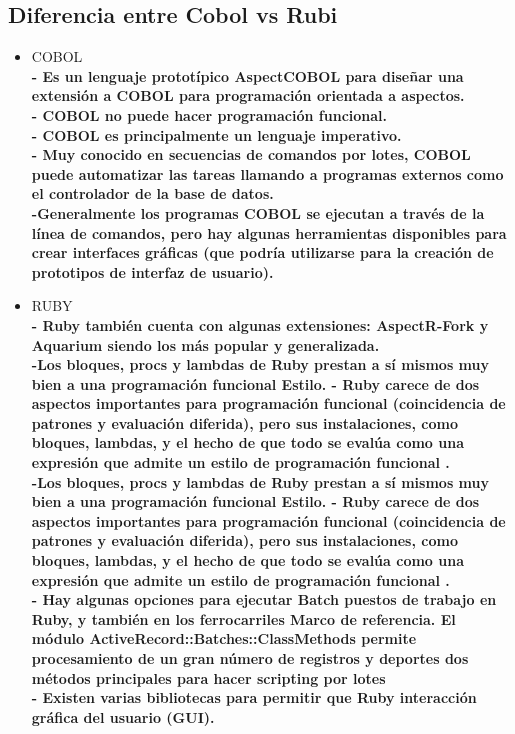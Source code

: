\documentclass[twoside,twocolumn]{article}
\begin{document}
\subsection{Diferencia entre Cobol vs Rubi}
\begin{itemize}
\item COBOL
\\ \textbf{- Es un lenguaje prototípico AspectCOBOL para diseñar una extensión a COBOL para programación orientada a aspectos.}
\\ \textbf{- COBOL no puede hacer programación funcional.}
\\ \textbf{- COBOL es principalmente un lenguaje imperativo. }
\\ \textbf{- Muy conocido en secuencias de comandos por lotes, COBOL puede automatizar las tareas llamando a programas externos
como el controlador de la base de datos.}
\\ \textbf{-Generalmente los programas COBOL se ejecutan a través de
la línea de comandos, pero hay algunas herramientas
disponibles para crear interfaces gráficas (que
podría utilizarse para la creación de prototipos de interfaz de usuario).}
\item RUBY
\\ \textbf{- Ruby también cuenta con algunas extensiones:
AspectR-Fork y Aquarium siendo los más
popular y generalizada.}
\\ \textbf{-Los bloques, procs y lambdas de Ruby prestan
a sí mismos muy bien a una programación funcional
Estilo.
- Ruby carece de dos aspectos importantes para
programación funcional (coincidencia de patrones y
evaluación diferida), pero sus instalaciones, como
bloques, lambdas, y el hecho de que todo
se evalúa como una expresión que admite un
estilo de programación funcional
.}
\\ \textbf{-Los bloques, procs y lambdas de Ruby prestan
a sí mismos muy bien a una programación funcional
Estilo.
- Ruby carece de dos aspectos importantes para
programación funcional (coincidencia de patrones y
evaluación diferida), pero sus instalaciones, como
bloques, lambdas, y el hecho de que todo
se evalúa como una expresión que admite un
estilo de programación funcional
.}
\\ \textbf{-  Hay algunas opciones para ejecutar Batch
puestos de trabajo en Ruby, y también en los ferrocarriles
Marco de referencia. El módulo
ActiveRecord::Batches::ClassMethods permite
procesamiento de un gran número de registros y deportes
dos métodos principales para hacer scripting por lotes}
\\ \textbf{- Existen varias bibliotecas para permitir que Ruby
interacción gráfica del usuario (GUI).
}
\end{itemize}
\end{document}
